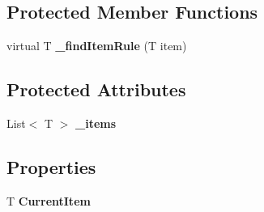 \subsection*{Protected Member Functions}
\begin{DoxyCompactItemize}
\item 
\hypertarget{classlib_watcher_dialog_1_1_property_item_1_1_items_management_3_01_t_01_4_a9fb0cca6d4520d1a91a7d158b042015c}{virtual T {\bfseries \+\_\+find\+Item\+Rule} (T item)}\label{classlib_watcher_dialog_1_1_property_item_1_1_items_management_3_01_t_01_4_a9fb0cca6d4520d1a91a7d158b042015c}

\end{DoxyCompactItemize}
\subsection*{Protected Attributes}
\begin{DoxyCompactItemize}
\item 
\hypertarget{classlib_watcher_dialog_1_1_property_item_1_1_items_management_3_01_t_01_4_a2235a43476e6cb9e601ecfb74922d5bb}{List$<$ T $>$ {\bfseries \+\_\+items}}\label{classlib_watcher_dialog_1_1_property_item_1_1_items_management_3_01_t_01_4_a2235a43476e6cb9e601ecfb74922d5bb}

\end{DoxyCompactItemize}
\subsection*{Properties}
\begin{DoxyCompactItemize}
\item 
\hypertarget{classlib_watcher_dialog_1_1_property_item_1_1_items_management_3_01_t_01_4_adb41a7092de8975cf0b4d1e12948735b}{T {\bfseries Current\+Item}}\label{classlib_watcher_dialog_1_1_property_item_1_1_items_management_3_01_t_01_4_adb41a7092de8975cf0b4d1e12948735b}

\end{DoxyCompactItemize}
